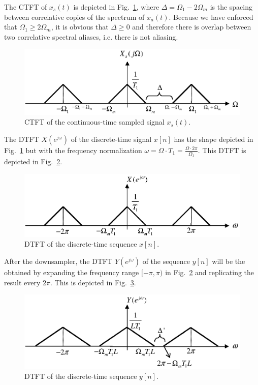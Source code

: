 \documentclass[a4paper,11pt,oneside]{article}
\begin{document}
The CTFT of $x_s(t)$ is depicted in Fig.~\ref{ctftxs}, where $\Delta=\Omega_1-2\Omega_m$ is the spacing between correlative copies of the spectrum of $x_a(t)$. Because we have enforced that $\Omega_1\geq 2\Omega_m$, it is obvious that $\Delta\geq 0$ and therefore there is overlap between two correlative spectral aliases, i.e. there is not aliasing.

\begin{figure}[h!]
\centering
\includegraphics[width=.8\textwidth]{ctftxs.eps}
\caption{CTFT of the continuous-time sampled signal $x_s(t)$.}
\label{ctftxs}
\end{figure}

The DTFT $X(e^{j\omega})$ of the discrete-time signal $x[n]$ has the shape depicted in Fig.~\ref{ctftxs} but with the frequency normalization $\omega=\Omega\cdot T_1=\frac{\Omega\cdot 2\pi}{\Omega_1}$. This DTFT is depicted in Fig.~\ref{dtftx}.

\begin{figure}[h!]
\centering
\includegraphics[width=.8\textwidth]{dtftx.eps}
\caption{DTFT of the discrete-time sequence $x[n]$.}
\label{dtftx}
\end{figure}

After the downsampler, the DTFT $Y(e^{j\omega})$ of the sequence $y[n]$ will be the obtained by expanding the frequency range $[-\pi,\pi)$ in Fig.~\ref{dtftx} and replicating the result every $2\pi$. This is depicted in Fig.~\ref{dtfty}.


\begin{figure}[h!]
\centering
\includegraphics[width=.8\textwidth]{dtfty.eps}
\caption{DTFT of the discrete-time sequence $y[n]$.}
\label{dtfty}
\end{figure}
\end{document}
